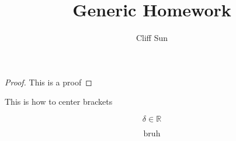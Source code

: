 \documentclass{article}
\title{Generic Homework}
\author{Cliff Sun}
\begin{document}
\maketitle

\begin{proof}
    This is a proof 
\end{proof}   

This is how to center brackets

\[
\delta \in \mathbb{R}   
\]

\begin{equation}
    \textrm{bruh}
\end{equation}
\end{document}

